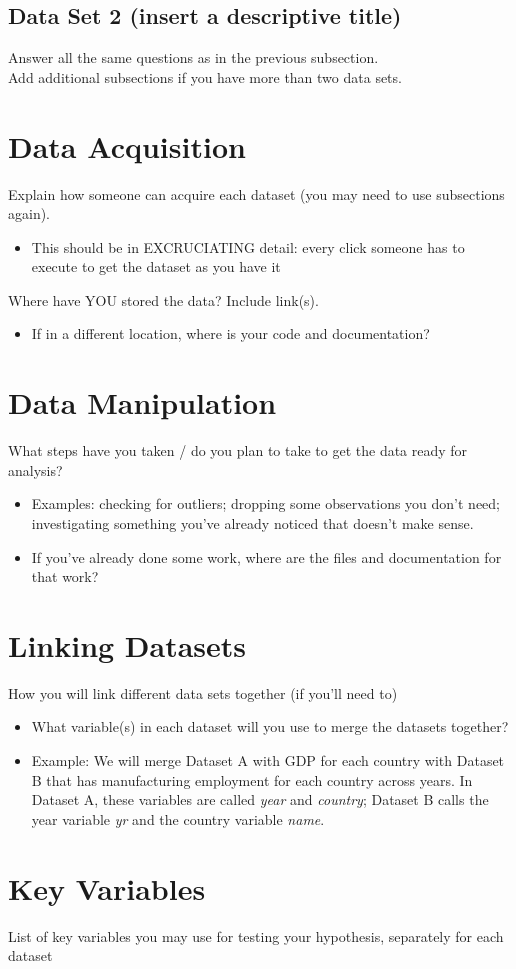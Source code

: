 \documentclass[12pt]{article}
\begin{document}
\subsection{Data Set 2 (insert a descriptive title)}

Answer all the same questions as in the previous subsection. \\

\noindent Add additional subsections if you have more than two data sets.


\section{Data Acquisition}
\label{sec:theory}

Explain how someone can acquire each dataset (you may need to use subsections again).
\begin{itemize}
    \item This should be in EXCRUCIATING detail: every click someone has to execute to get the dataset as you have it
\end{itemize}

\noindent Where have YOU stored the data? Include link(s).
\begin{itemize}
    \item If in a different location, where is your code and documentation?
\end{itemize}


\section{Data Manipulation}
\label{sec:data}

What steps have you taken / do you plan to take to get the data ready for analysis? 
\begin{itemize}
    \item Examples: checking for outliers; dropping some observations you don't need; investigating something you've already noticed that doesn't make sense.
    \item If you've already done some work, where are the files and documentation for that work?
\end{itemize}

\section{Linking Datasets}
\label{sec:discussion}

How you will link different data sets together (if you'll need to)
\begin{itemize}
    \item What variable(s) in each dataset will you use to merge the datasets together?
    \item Example: We will merge Dataset A with GDP for each country with Dataset B that has manufacturing employment for each country across years. In Dataset A, these variables are called \textit{year} and \emph{country}; Dataset B calls the year variable \emph{yr} and the country variable \emph{name}.
\end{itemize}


\section{Key Variables}
\label{sec:result}

List of key variables you may use for testing your hypothesis, separately for each dataset
\end{document}
